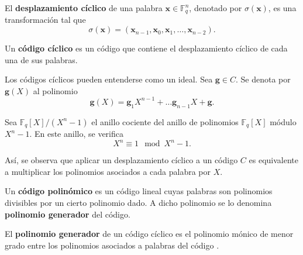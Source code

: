 \begin{definition}
	El \textbf{desplazamiento cíclico} de una palabra $\textbf{x} \in \mathbb{F}_q^n$, denotado por $\sigma(\textbf{x})$, es una transformación tal que
	\[\sigma(\textbf{x}) = (\textbf{x}_{n-1}, \textbf{x}_0, \textbf{x}_1, \dots, \textbf{x}_{n-2}).\]
\end{definition}

\begin{definition}
	Un \textbf{código cíclico} es un código que contiene el desplazamiento cíclico de cada una de sus palabras.
\end{definition}

\begin{remark}
	Los códigos cíclicos pueden entenderse como un ideal. Sea $\textbf{g} \in C$. Se denota por $\textbf{g}(X)$ al polinomio
	\[\textbf{g}(X) = \textbf{g}_1X^{n-1} + \hdots \textbf{g}_{n-1}X + \textbf{g}.\]
	
	Sea $\mathbb{F}_q[X] / (X^n - 1)$ el anillo cociente del anillo de polinomios $\mathbb{F}_q[X]$ módulo $X^n - 1$. En este anillo, se verifica
	\[X^n \equiv 1 \mod X^n - 1.\]
	
	Así, se observa que aplicar un desplazamiento cíclico a un código $C$ es equivalente a multiplicar los polinomios asociados a cada palabra por $X$.
\end{remark}



\begin{definition}
	Un \textbf{código polinómico} es un código lineal cuyas palabras son polinomios divisibles por un cierto polinomio dado. A dicho polinomio se lo denomina \textbf{polinomio generador} del código.
\end{definition}

\begin{definition}
	El \textbf{polinomio generador} de un código cíclico es el polinomio mónico de menor grado entre los polinomios asociados a palabras del código \autocite{VERLINDE2003203}.
\end{definition}

